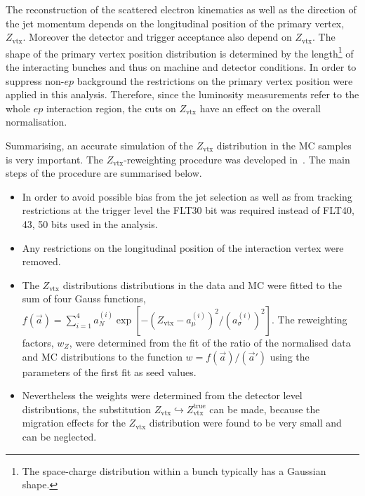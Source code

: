 The reconstruction of the scattered electron kinematics as well as the direction of the jet momentum depends on the longitudinal position of the primary vertex, $Z_\text{vtx}$. Moreover the detector and trigger acceptance also depend on $Z_\text{vtx}$. The shape of the primary vertex position distribution is determined by the length\footnote{The space-charge distribution within a bunch typically has a Gaussian shape.} of the interacting bunches and thus on machine and detector conditions. In order to suppress non-$ep$ background the restrictions on the primary vertex position were applied in this analysis. Therefore, since the luminosity measurements refer to the whole $ep$ interaction region, the cuts on $Z_\text{vtx}$ have an effect on the overall normalisation. 

Summarising, an accurate simulation of the $Z_\text{vtx}$ distribution in the MC samples is very important. The $Z_\text{vtx}$-reweighting procedure was developed in~\cite{joerg}. The main steps of the procedure are summarised below.
\begin{itemize}
 \item In order to avoid possible bias from the jet selection as well as from tracking restrictions at the trigger level the FLT30 bit was required instead of FLT40, 43, 50 bits used in the analysis.
 \item Any restrictions on the longitudinal position of the interaction vertex were removed.
 \item The $Z_\text{vtx}$ distributions distributions in the data and MC were fitted to the sum of four Gauss functions, $f\left(\vec a\right)=\sum_{i=1}^4{a_N^{\left(i\right)}\exp{\left[-\left(Z_\text{vtx}-a_{\mu}^{\left(i\right)}\right)^2/\left(a_\sigma^{\left(i\right)}\right)^2\right]}}$. The reweighting factors, $w_{Z}$, were determined from the fit of the ratio of the normalised data and MC distributions to the function $w=f\left(\vec a\right)/\left(\vec a'\right)$ using the parameters of the first fit as seed values.
 \item Nevertheless the weights were determined from the detector level distributions, the substitution $Z_\text{vtx} \hookrightarrow Z_\text{vtx}^\text{true}$ can be made, because the migration effects for the $Z_\text{vtx}$ distribution were found to be very small and can be neglected.
\end{itemize}

